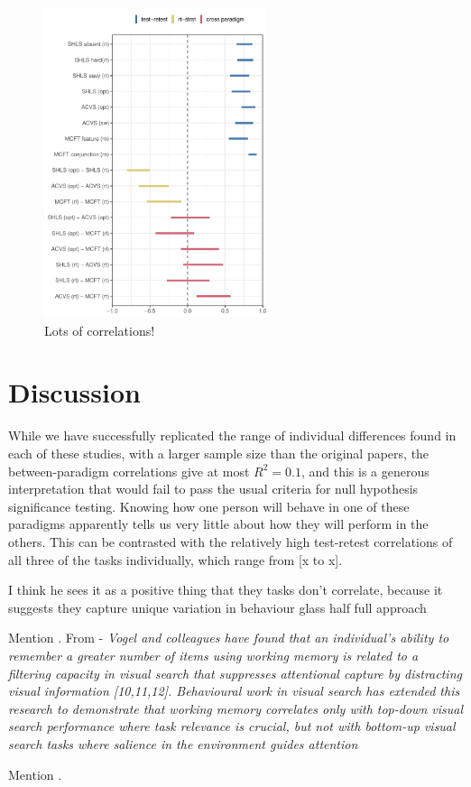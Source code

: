\documentclass[]{rsos}%
\begin{document}
\begin{figure}
\centering
\includegraphics[width=6.5cm]{../Scripts/scratch/cor_comparison.pdf}
\caption{Lots of correlations!}
\label{fig:all_the_cor}
\end{figure}


\section{Discussion}

While we have successfully replicated the range of individual differences found in each of these studies, with a larger sample size than the original papers, the between-paradigm correlations give at most $R^2 = 0.1$, and this is a generous interpretation that would fail to pass the usual criteria for null hypothesis significance testing. Knowing how one person will behave in one of these paradigms apparently tells us very little about how they will perform in the others. This can be contrasted with the relatively high test-retest correlations of all three of the tasks individually, which range from [x to x]. 



I think he sees it as a positive thing that they tasks don't correlate, because it suggests they capture unique variation in behaviour glass half full approach 

Mention \cite{vogel2008}.
From \cite{proulx2011} - \textit{Vogel and colleagues have found that an individual's ability to remember a greater number of items using working memory is related to a filtering capacity in visual search that suppresses attentional capture by distracting visual information [10,11,12]. Behavioural work in visual search has extended this research to
demonstrate that working memory correlates only with top-down
visual search performance where task relevance is crucial, but not
with  bottom-up  visual  search  tasks  where  salience  in  the
environment guides attention \cite{sobel2007}}


Mention \cite{stoet2011}.




\end{document}
